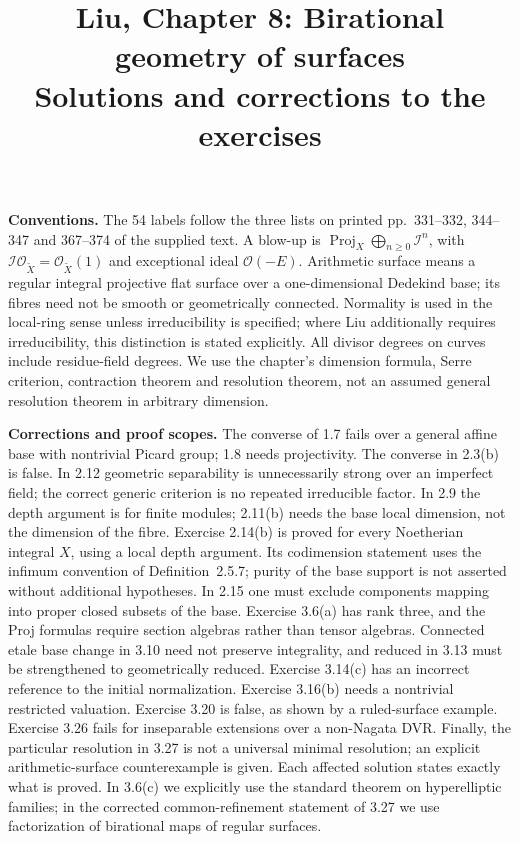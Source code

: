 \documentclass[11pt]{article}
\title{Liu, Chapter 8: Birational geometry of surfaces\\[2pt]\large Solutions and corrections to the exercises}
\author{}
\date{}
\begin{document}
\maketitle
\textbf{Conventions.} The 54 labels follow the three lists on printed pp.~331--332, 344--347 and 367--374 of the supplied text. A blow-up is $\operatorname{Proj}_X\bigoplus_{n\ge0}\mathcal I^n$, with $\mathcal I\mathcal O_{\widetilde X}=\mathcal O_{\widetilde X}(1)$ and exceptional ideal $\mathcal O(-E)$. Arithmetic surface means a regular integral projective flat surface over a one-dimensional Dedekind base; its fibres need not be smooth or geometrically connected. Normality is used in the local-ring sense unless irreducibility is specified; where Liu additionally requires irreducibility, this distinction is stated explicitly. All divisor degrees on curves include residue-field degrees. We use the chapter's dimension formula, Serre criterion, contraction theorem and resolution theorem, not an assumed general resolution theorem in arbitrary dimension.

\textbf{Corrections and proof scopes.} The converse of 1.7 fails over a general affine base with nontrivial Picard group; 1.8 needs projectivity. The converse in 2.3(b) is false. In 2.12 geometric separability is unnecessarily strong over an imperfect field; the correct generic criterion is no repeated irreducible factor. In 2.9 the depth argument is for finite modules; 2.11(b) needs the base local dimension, not the dimension of the fibre. Exercise 2.14(b) is proved for every Noetherian integral $X$, using a local depth argument. Its codimension statement uses the infimum convention of Definition~2.5.7; purity of the base support is not asserted without additional hypotheses. In 2.15 one must exclude components mapping into proper closed subsets of the base. Exercise 3.6(a) has rank three, and the Proj formulas require section algebras rather than tensor algebras. Connected etale base change in 3.10 need not preserve integrality, and reduced in 3.13 must be strengthened to geometrically reduced. Exercise 3.14(c) has an incorrect reference to the initial normalization. Exercise 3.16(b) needs a nontrivial restricted valuation. Exercise 3.20 is false, as shown by a ruled-surface example. Exercise 3.26 fails for inseparable extensions over a non-Nagata DVR. Finally, the particular resolution in 3.27 is not a universal minimal resolution; an explicit arithmetic-surface counterexample is given. Each affected solution states exactly what is proved. In 3.6(c) we explicitly use the standard theorem on hyperelliptic families; in the corrected common-refinement statement of 3.27 we use factorization of birational maps of regular surfaces.
\end{document}
